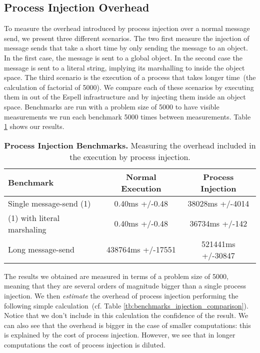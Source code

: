 \subsection{Process Injection Overhead}

To measure the overhead introduced by process injection over a normal message send, we present three different scenarios. The two first measure the injection of message sends that take a short time by only sending the  message to an object. In the first case, the message is sent to a global object. In the second case the message is sent to a literal string, implying its marshalling to inside the object space. The third scenario is the execution of a process that takes longer time~(the calculation of factorial of 5000). We compare each of these scenarios by executing them in out of the Espell infrastructure and by injecting them inside an object space. Benchmarks are run with a problem size of 5000 to have visible measurements \ie we run each benchmark 5000 times between measurements. Table \ref{tb:benchmarks_injection} shows our results.

\begin{table}[ht]

 	\centering
 	\begin{tabular}{lcc}%
			\toprule
			\textbf{Benchmark}
 			& \textbf{Normal Execution}
			& \textbf{Process Injection}\\
		\midrule
		Single message-send (1) &0.40ms +/-0.48 & 38028ms +/-4014 \\\midrule
		(1) with literal marshaling & 0.40ms +/-0.48 & 36734ms +/-142 \\\midrule
		Long message-send & 438764ms +/-17551 & 521441ms +/-30847\\\midrule
 	\end{tabular}
	\vspace*{0.2cm}
 	\caption{\textbf{Process Injection Benchmarks.} Measuring the overhead included in the execution by process injection.\label{tb:benchmarks_injection}}
 \end{table}

The results we obtained are measured in terms of a problem size of 5000, meaning that they are several orders of magnitude bigger than a single process injection. We then \emph{estimate} the overhead of process injection performing the following simple calculation~(cf. Table \ref{tb:benchmarks_injection_comparison}). Notice that we don't include in this calculation the confidence of the result. We can also see that the overhead is bigger in the case of smaller computations: this is explained by the cost of process injection. However, we see that in longer computations the cost of process injection is diluted.

